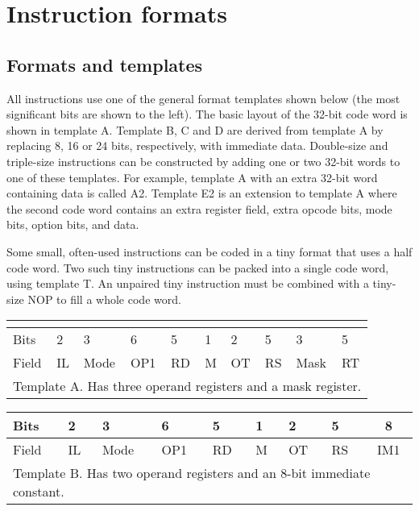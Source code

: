 \documentclass[forwardcom.tex]{subfiles}
\begin{document}
\RaggedRight

\chapter{Instruction formats}
\section{Formats and templates}
All instructions use one of the general format templates shown below (the most significant bits are shown to the left). The basic layout of the 32-bit code word is shown in template A. Template B, C and D are derived from template A by replacing 8, 16 or 24 bits, respectively, with immediate data. Double-size and triple-size instructions can be constructed by adding one or two 32-bit words to one of these templates. For example, template A with an extra 32-bit word containing data is called A2. Template E2 is an extension to template A where the second code word contains an extra register field, extra opcode bits, mode bits, option bits, and data.
\vspace{2mm}

Some small, often-used instructions can be coded in a tiny format that uses a half code word. Two such tiny instructions can be packed into a single code word, using template T. An unpaired tiny instruction must be combined with a tiny-size NOP to fill a whole code word.

\begin{longtable}[l]
{|p{8mm}|p{8mm}|p{8mm}|p{8mm}|p{8mm}|p{8mm}|p{8mm}|p{8mm}|p{8mm}|p{8mm}|}
\endfirsthead
 \label{table:templateA} \\
\endhead
\hline
 Bits & 2 & 3 & 6 & 5 & 1 & 2 & 5 & 3 & 5 \\
\hline
Field & IL & Mode & OP1 & RD & M & OT & RS & Mask & RT \\
\hline
\multicolumn{10}{|l|}{
Template A. Has three operand registers and a mask register.} \\
\hline
\end{longtable}

\begin{longtable}[l]{|p{8mm}|p{8mm}|p{8mm}|p{8mm}|p{8mm}|p{8mm}|p{8mm}|p{8mm}|p{8mm}|p{16mm}|}
\endfirsthead
\label{table:templateB}
\endhead
\hline
  Bits & 2 & 3 & 6 & 5 & 1 & 2 & 5 & 
  \multicolumn{2}{|c|}{ 8 } \\
\hline
Field & IL & Mode & OP1 & RD & M & OT & RS & 
  \multicolumn{2}{|c|}{ IM1 } \\
\hline
  \multicolumn{10}{|l|}{
Template B. Has two operand registers and an 8-bit immediate constant.}  \\
\hline
\end{longtable}
\end{document}
